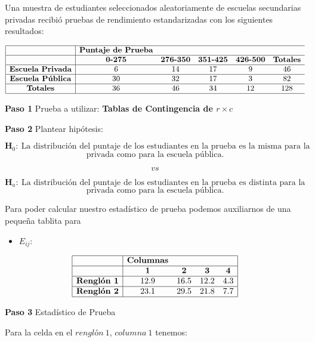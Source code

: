 \documentclass[
  a4paper,
  oneside,
  openany]{book}
\providecommand{\tightlist}{%
  \setlength{\itemsep}{0pt}\setlength{\parskip}{0pt}}
\begin{document}
Una muestra de estudiantes seleccionados aleatoriamente de escuelas secundarias privadas recibió pruebas de rendimiento estandarizadas con los siguientes resultados:

\[
\begin{array}{ |c|cc c c c c|}
\hline
&\textbf{Puntaje de Prueba}&&&&\\
\hline
&\textbf{0-275} & \textbf{276-350} & \textbf{351-425} & \textbf{426-500} & \textbf{Totales} \\
\hline
\textbf{Escuela Privada} & 6    & 14 & 17 & 9 & 46 \\
\hline
\textbf{Escuela Pública} & 30   & 32 & 17 & 3 & 82 \\
\hline
\textbf{Totales} & 36   & 46 & 34 & 12 & 128 \\
\hline
\end{array}
\]

\textbf{Paso 1} Prueba a utilizar: \textbf{Tablas de Contingencia de \(r\times c\)}

\textbf{Paso 2} Plantear hipótesis:

\[\textbf{H}_0: \ \mbox{La distribución del puntaje de los estudiantes en la prueba es la misma para la escuela}\]
\[\mbox{privada como para la escuela pública.}\]

\[vs\]

\[\textbf{H}_a: \ \mbox{La distribución del puntaje de los estudiantes en la prueba es distinta para la escuela}\]
\[\mbox{privada como para la escuela pública.}\]

Para poder calcular nuestro estadístico de prueba podemos auxiliarnos de una pequeña tablita para

\begin{itemize}
\tightlist
\item
  \(E_{ij}:\)
\end{itemize}

\[
\begin{array}{ |c|cccc|  }
\hline
&\textbf{Columnas} & & &\\
\hline
&\textbf{1} & \textbf{2} & \textbf{3} & \textbf{4} \\
\hline
\textbf{Renglón 1} & 12.9   & 16.5 & 12.2 & 4.3 \\
\hline
\textbf{Renglón 2} & 23.1   & 29.5 & 21.8 & 7.7 \\
\hline
\end{array}
\]

\textbf{Paso 3} Estadístico de Prueba

Para la celda en el \(renglón\ 1\), \(columna\ 1\) tenemos:
\end{document}
